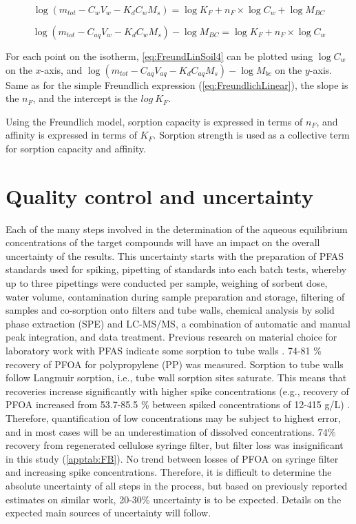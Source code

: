 \begin{equation} \label{eq:FreundLinSoil3}
    \log (m_{tot} - C_{w}V_{w} - K_dC_{w}M_s) = \log K_{F} + n_F \times \log C_{w} + \log M_{BC}
\end{equation}

\begin{equation} \label{eq:FreundLinSoil4}
    \log (m_{tot} - C_{aq}V_{w} - K_dC_{w}M_s) - \log M_{BC} = \log K_{F} + n_F \times \log C_{w}  
\end{equation}

For each point on the isotherm, \cref{eq:FreundLinSoil4} can be plotted using $\log C_{w}$ on the $x$-axis, and $\log (m_{tot} - C_{aq}V_{aq} - K_dC_{aq}M_s) - \log M_{bc}$ on the $y$-axis. Same as for the simple Freundlich expression (\cref{eq:FreundlichLinear}), the slope is the $n_F$, and the intercept is the $log~K_F$. 

Using the Freundlich model, sorption capacity is expressed in terms of \(n_F\), and affinity is expressed in terms of \(K_F\). Sorption strength is used as a collective term for sorption capacity and affinity.   

\section{Quality control and uncertainty\label{sec:losses}}
Each of the many steps involved in the determination of the aqueous equilibrium concentrations of the target compounds will have an impact on the overall uncertainty of the results. This uncertainty starts with the preparation of PFAS standards used for spiking, pipetting of standards into each batch tests, whereby up to three pipettings were conducted per sample, weighing of sorbent dose, water volume, contamination during sample preparation and storage, filtering of samples and co-sorption onto filters and tube walls, chemical analysis by solid phase extraction (SPE) and LC-MS/MS, a combination of automatic and manual peak integration, and data treatment. Previous research on material choice for laboratory work with PFAS indicate some sorption to tube walls \citep{Lath2019labsorb}. 74-81 \% recovery of PFOA for polypropylene (PP) was measured. Sorption to tube walls follow Langmuir sorption, i.e., tube wall sorption sites saturate. This means that recoveries increase significantly with higher spike concentrations (e.g., recovery of PFOA increased from 53.7-85.5 \% between spiked concentrations of 12-415 \textmu g/L) \citep{Lath2019labsorb}. Therefore, quantification of low concentrations may be subject to highest error, and in most cases will be an underestimation of dissolved concentrations. 74\% recovery from regenerated cellulose syringe filter, but filter loss was insignificant in this study (\cref{apptab:FB}). No trend between losses of PFOA on syringe filter and increasing spike concentrations. Therefore, it is difficult to determine the absolute uncertainty of all steps in the process, but based on previously reported estimates on similar work, 20-30\% uncertainty is to be expected. Details on the expected main sources of uncertainty will follow.

